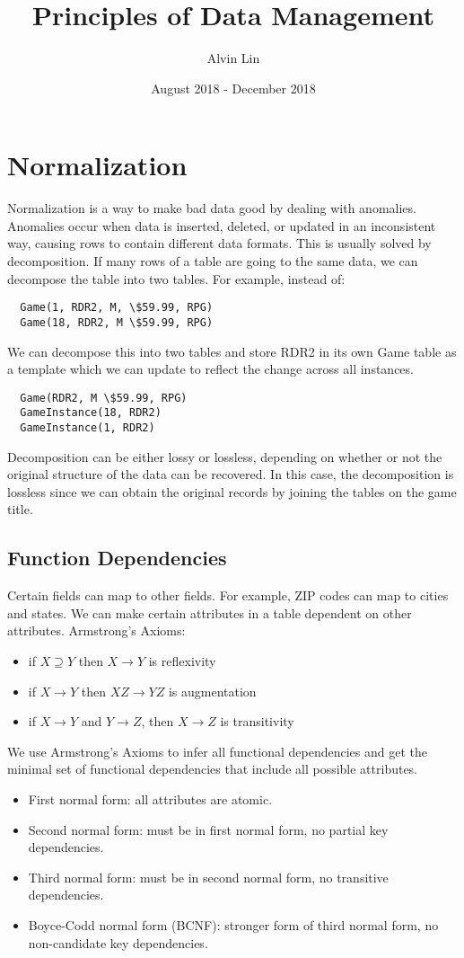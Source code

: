 \documentclass{math}
\title{Principles of Data Management}
\author{Alvin Lin}
\date{August 2018 - December 2018}
\begin{document}
\lstset{basicstyle=\ttfamily\footnotesize,breaklines=true}
\maketitle

\section*{Normalization}
Normalization is a way to make bad data good by dealing with anomalies.
Anomalies occur when data is inserted, deleted, or updated in an inconsistent
way, causing rows to contain different data formats. This is usually solved
by decomposition. If many rows of a table are going to the same data, we can
decompose the table into two tables. For example, instead of:
\begin{lstlisting}
  Game(1, RDR2, M, \$59.99, RPG)
  Game(18, RDR2, M \$59.99, RPG)
\end{lstlisting}
We can decompose this into two tables and store RDR2 in its own Game table as
a template which we can update to reflect the change across all instances.
\begin{lstlisting}
  Game(RDR2, M \$59.99, RPG)
  GameInstance(18, RDR2)
  GameInstance(1, RDR2)
\end{lstlisting}
Decomposition can be either lossy or lossless, depending on whether or not the
original structure of the data can be recovered. In this case, the decomposition
is lossless since we can obtain the original records by joining the tables on
the game title.

\subsection*{Function Dependencies}
Certain fields can map to other fields. For example, ZIP codes can map to cities
and states. We can make certain attributes in a table dependent on other
attributes. Armstrong's Axioms:
\begin{itemize}
  \item if \( X\supseteq Y \) then \( X\to Y \) is reflexivity
  \item if \( X\to Y \) then \( XZ\to YZ \) is augmentation
  \item if \( X\to Y \) and \( Y\to Z \), then \( X\to Z \) is transitivity
\end{itemize}
We use Armstrong's Axioms to infer all functional dependencies and get the
minimal set of functional dependencies that include all possible attributes.
\begin{itemize}
  \item First normal form: all attributes are atomic.
  \item Second normal form: must be in first normal form, no partial key
    dependencies.
  \item Third normal form: must be in second normal form, no transitive
    dependencies.
  \item Boyce-Codd normal form (BCNF): stronger form of third normal form, no
    non-candidate key dependencies.
\end{itemize}
\end{document}
